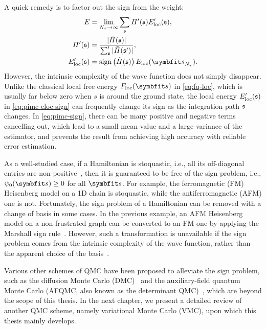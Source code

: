 A quick remedy is to factor out the sign from the weight:
\begin{align}
E &= \lim_{N_\tau \to \infty} \sum_\svs \varPi'(\svs) E'_\text{loc}(\svs), \label{eq:pimc-sign} \\
\varPi'(\svs) &= \frac{|\tilde{\varPi}(\svs)|}{\sum_\svs' |\tilde{\varPi}(\svs')|}, \\
E'_\text{loc}(\svs) &= \sign\left( \tilde{\varPi}(\svs) \right) E_\text{loc}(\vs_{N_\tau}). \label{eq:pimc-eloc-sign}
\end{align}
However, the intrinsic complexity of the wave function does not simply disappear. Unlike the classical local free energy $F_\text{loc}(\vs)$ in \cref{eq:fq-loc}, which is usually far below zero when $s$ is around the ground state, the local energy $E'_\text{loc}(\mathfrak{s})$ in \cref{eq:pimc-eloc-sign} can frequently change its sign as the integration path $\mathfrak{s}$ changes. In \cref{eq:pimc-sign}, there can be many positive and negative terms cancelling out, which lead to a small mean value and a large variance of the estimator, and prevents the result from achieving high accuracy with reliable error estimation.

As a well-studied case, if a Hamiltonian is stoquastic, i.e., all its off-diagonal entries are non-positive~\cite{bravyi2008complexity}, then it is guaranteed to be free of the sign problem, i.e., $\psi_0(\vs) \ge 0$ for all $\vs$. For example, the ferromagnetic (FM) Heisenberg model on a 1D chain is stoquastic, while the antiferromagnetic (AFM) one is not. Fortunately, the sign problem of a Hamiltonian can be removed with a change of basis in some cases. In the previous example, an AFM Heisenberg model on a non-frustrated graph can be converted to an FM one by applying the Marshall sign rule~\cite{marshall1955antiferromagnetism}. However, such a transformation is unavailable if the sign problem comes from the intrinsic complexity of the wave function, rather than the apparent choice of the basis~\cite{troyer2005computational}.

Various other schemes of QMC have been proposed to alleviate the sign problem, such as the diffusion Monte Carlo (DMC)~\cite{kalos1974helium, reynolds1982fixed, becca2017quantum10} and the auxiliary-field quantum Monte Carlo (AFQMC, also known as the determinant QMC)~\cite{blankenbecler1981monte, zhang2003quantum}, which are beyond the scope of this thesis. In the next chapter, we present a detailed review of another QMC scheme, namely variational Monte Carlo (VMC), upon which this thesis mainly develops.

